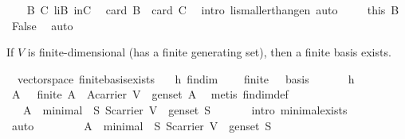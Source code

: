 \begin{isabellebody}
\ \ \isamarkupfalse%
\ B\ C\ liB\ inC\ \isamarkupfalse%
\ {\isachardoublequoteopen}card\ B\ {\isasymle}\ card\ C{\isachardoublequoteclose}\ \isamarkupfalse%
\ {\isacharparenleft}intro\ li{\isacharunderscore}smaller{\isacharunderscore}than{\isacharunderscore}gen{\isacharcomma}\ auto{\isacharparenright}\ \isanewline
\ \ \isamarkupfalse%
\ this\ B\ \isamarkupfalse%
\ False\ \isamarkupfalse%
\ auto\isanewline
{}\isamarkupfalse%
%
\endisatagproof
{\isafoldproof}%
%
\isadelimproof
%
\endisadelimproof
%
\begin{isamarkuptext}%
If $V$ is finite-dimensional (has a finite generating set), then a finite basis exists.%
\end{isamarkuptext}%
\isamarkuptrue%
\isamarkupfalse%
\ {\isacharparenleft}\ vectorspace{\isacharparenright}\ finite{\isacharunderscore}basis{\isacharunderscore}exists{\isacharcolon}\isanewline
\ \ \ h{}{\isacharcolon}\ {\isachardoublequoteopen}fin{\isacharunderscore}dim{\isachardoublequoteclose}\isanewline
\ \ \ {\isachardoublequoteopen}{\isasymexists}{\isasymbeta}{\isachardot}\ finite\ {\isasymbeta}\ {\isasymand}\ basis\ {\isasymbeta}{\isachardoublequoteclose}\isanewline
%
\isadelimproof
%
\endisadelimproof
%
\isatagproof
{}\isamarkupfalse%
\ {\isacharminus}\isanewline
\ \ \isamarkupfalse%
\ h{}\ \isamarkupfalse%
\ A\ \ {}{\isacharcolon}\ {\isachardoublequoteopen}finite\ A\ {\isasymand}\ A{\isasymsubseteq}carrier\ V\ {\isasymand}\ gen{\isacharunderscore}set\ A{\isachardoublequoteclose}\ \isamarkupfalse%
\ {\isacharparenleft}metis\ fin{\isacharunderscore}dim{\isacharunderscore}def{\isacharparenright}\isanewline
\ \ \isamarkupfalse%
\ {}{\isacharcolon}\ {\isachardoublequoteopen}{\isasymexists}{\isasymbeta}{\isachardot}\ {\isasymbeta}{\isasymsubseteq}A\ {\isasymand}\ minimal\ {\isasymbeta}\ {\isacharparenleft}{\isasymlambda}S{\isachardot}\ S{\isasymsubseteq}carrier\ V\ {\isasymand}\ gen{\isacharunderscore}set\ S{\isacharparenright}{\isachardoublequoteclose}\ \isanewline
\ \ \ \ \isamarkupfalse%
\ {\isacharparenleft}intro\ minimal{\isacharunderscore}exists{\isacharparenright}\ \isanewline
\ \ \ \ \ \isamarkupfalse%
\ auto\isanewline
\ \ \isamarkupfalse%
\ \isamarkupfalse%
\ {\isasymbeta}\ \ {}{\isacharcolon}\ {\isachardoublequoteopen}{\isasymbeta}{\isasymsubseteq}A\ {\isasymand}\ minimal\ {\isasymbeta}\ {\isacharparenleft}{\isasymlambda}S{\isachardot}\ S{\isasymsubseteq}carrier\ V\ {\isasymand}\ gen{\isacharunderscore}set\ S{\isacharparenright}{\isachardoublequoteclose}\ \isamarkupfalse%

\end{isabellebody}
